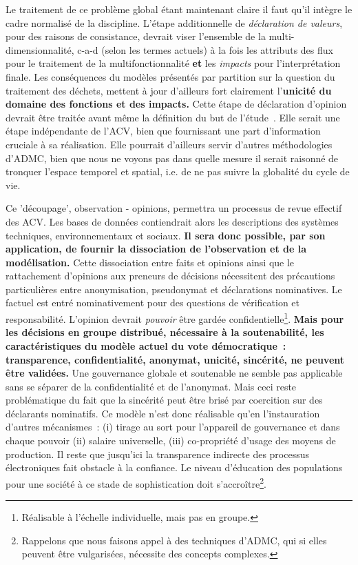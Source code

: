 Le traitement de ce problème global étant maintenant claire il faut qu'il intègre le cadre normalisé de la discipline.
L'étape additionnelle de \emph{déclaration de valeurs}, pour des raisons de consistance, devrait viser l'ensemble de la multi-dimensionnalité, c-a-d (selon les termes actuels) à la fois les attributs des flux pour le traitement de la multifonctionnalité \textbf{et} les \emph{impacts} pour l'interprétation finale.
Les conséquences du modèles présentés par partition sur la question du traitement des déchets, mettent à jour d'ailleurs fort clairement l'\textbf{unicité du domaine des fonctions et des impacts.}
Cette étape de déclaration d'opinion devrait être traitée avant même la définition du but de l'étude~\cite{patard_life_2015}.
Elle serait une étape indépendante de l'ACV, bien que fournissant une part d'information cruciale à sa réalisation.
Elle pourrait d'ailleurs servir d'autres méthodologies d'\gls{ADMC}, bien que nous ne voyons pas dans quelle mesure il serait raisonné de tronquer l'espace temporel et spatial, i.e. de ne pas suivre la globalité du cycle de vie.

Ce 'découpage', observation - opinions, permettra un processus de revue effectif des ACV.
Les bases de données contiendrait alors les descriptions des systèmes techniques, environnementaux et sociaux.
\textbf{Il sera donc possible, par son application, de fournir la dissociation de l'observation et de la modélisation.}
Cette dissociation entre faits et opinions ainsi que le rattachement d'opinions aux preneurs de décisions nécessitent des précautions particulières entre anonymisation, pseudonymat et déclarations nominatives.
Le factuel est entré nominativement pour des questions de  vérification et responsabilité.
L'opinion devrait \textit{pouvoir} être gardée confidentielle\footnote{Réalisable à l’échelle individuelle, mais pas en groupe.}.
\textbf{Mais pour les décisions en groupe distribué, nécessaire à la soutenabilité, les caractéristiques du modèle actuel du vote démocratique~: transparence, confidentialité, anonymat, unicité, sincérité, ne peuvent être validées.}
Une gouvernance globale et soutenable ne semble pas applicable sans se séparer de la confidentialité et de l'anonymat.
Mais ceci reste problématique du fait que la sincérité peut être brisé par coercition sur des déclarants nominatifs.
Ce modèle n'est donc réalisable qu'en l'instauration d'autres mécanismes~: (i) tirage au sort pour l'appareil de gouvernance et dans chaque pouvoir (ii) salaire universelle, (iii) co-propriété d'usage des moyens de production.
Il reste que jusqu'ici la transparence indirecte des processus électroniques fait obstacle à la confiance.
Le niveau d'éducation des populations pour une société à ce stade de sophistication doit s’accroître\footnote{Rappelons que nous faisons appel à des techniques d'\gls{ADMC}, qui si elles peuvent être vulgarisées, nécessite des concepts complexes.}.

